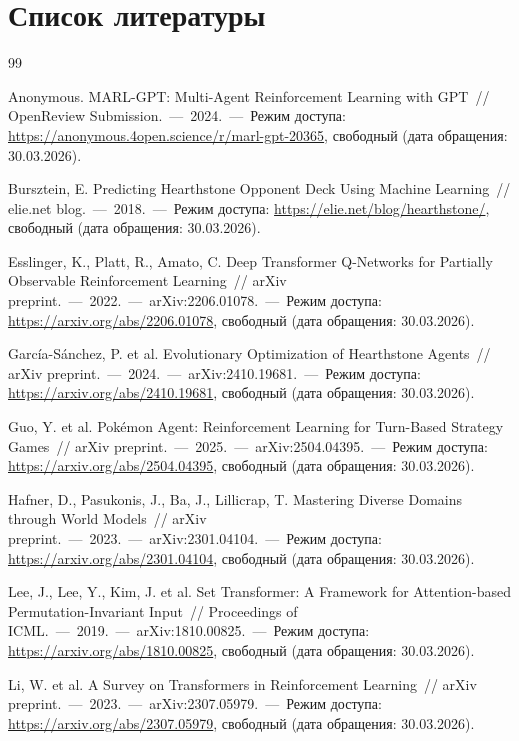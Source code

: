\documentclass[a4paper,12pt]{extarticle}
\begin{document}
\newpage

\section*{Список литературы}

\begin{thebibliography}{99}

  Anonymous. MARL-GPT: Multi-Agent Reinforcement Learning with GPT~// OpenReview Submission.~---~2024.~---~Режим доступа: \url{https://anonymous.4open.science/r/marl-gpt-20365}, свободный (дата обращения: 30.03.2026).

  Bursztein, E. Predicting Hearthstone Opponent Deck Using Machine Learning~// elie.net blog.~---~2018.~---~Режим доступа: \url{https://elie.net/blog/hearthstone/}, свободный (дата обращения: 30.03.2026).

  Esslinger, K., Platt, R., Amato, C. Deep Transformer Q-Networks for Partially Observable Reinforcement Learning~// arXiv preprint.~---~2022.~---~arXiv:2206.01078.~---~Режим доступа: \url{https://arxiv.org/abs/2206.01078}, свободный (дата обращения: 30.03.2026).

  Garc\'{i}a-S\'{a}nchez, P. et al. Evolutionary Optimization of Hearthstone Agents~// arXiv preprint.~---~2024.~---~arXiv:2410.19681.~---~Режим доступа: \url{https://arxiv.org/abs/2410.19681}, свободный (дата обращения: 30.03.2026).

  Guo, Y. et al. Pok\'{e}mon Agent: Reinforcement Learning for Turn-Based Strategy Games~// arXiv preprint.~---~2025.~---~arXiv:2504.04395.~---~Режим доступа: \url{https://arxiv.org/abs/2504.04395}, свободный (дата обращения: 30.03.2026).

  Hafner, D., Pasukonis, J., Ba, J., Lillicrap, T. Mastering Diverse Domains through World Models~// arXiv preprint.~---~2023.~---~arXiv:2301.04104.~---~Режим доступа: \url{https://arxiv.org/abs/2301.04104}, свободный (дата обращения: 30.03.2026).

  Lee, J., Lee, Y., Kim, J. et al. Set Transformer: A Framework for Attention-based Permutation-Invariant Input~// Proceedings of ICML.~---~2019.~---~arXiv:1810.00825.~---~Режим доступа: \url{https://arxiv.org/abs/1810.00825}, свободный (дата обращения: 30.03.2026).

  Li, W. et al. A Survey on Transformers in Reinforcement Learning~// arXiv preprint.~---~2023.~---~arXiv:2307.05979.~---~Режим доступа: \url{https://arxiv.org/abs/2307.05979}, свободный (дата обращения: 30.03.2026).


\end{thebibliography}
\end{document}
